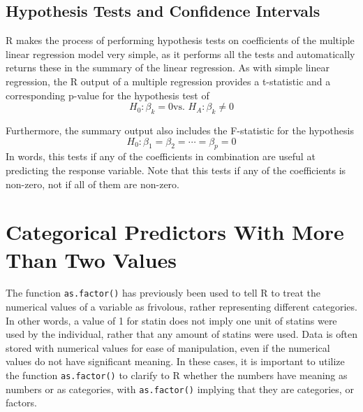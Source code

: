 \documentclass{report}\usepackage[]{graphicx}\usepackage[]{color}
\begin{document}
\subsection{Hypothesis Tests and Confidence Intervals}
\textsf{R} makes the process of performing hypothesis tests on coefficients of the multiple linear regression model very simple, as it performs all the tests and automatically returns these in the summary of the linear regression.  As with simple linear regression, the \textsf{R} output of a multiple regression provides a t-statistic and a corresponding p-value for the hypothesis test of 
\[ H_0: \beta_k = 0 \text{vs. } H_A: \beta_k \neq 0 \]

Furthermore, the summary output also includes the F-statistic for the hypothesis 
\[ H_0: \beta_1 = \beta_2 = \cdots = \beta_p = 0 \]
In words, this tests if any of the coefficients in combination are useful at predicting the response variable.  Note that this tests if any of the coefficients is non-zero, not if all of them are non-zero.  

\section{Categorical Predictors With More Than Two Values}
The function \texttt{as.factor()} has previously been used to tell \textsf{R} to treat the numerical values of a variable as frivolous, rather representing different categories.  In other words, a value of 1 for statin does not imply one unit of statins were used by the individual, rather that any amount of statins were used.  Data is often stored with numerical values for ease of manipulation, even if the numerical values do not have significant meaning.  In these cases, it is important to utilize the function \texttt{as.factor()} to clarify to \textsf{R} whether the numbers have meaning as numbers or as categories, with \texttt{as.factor()} implying that they are categories, or factors.  
\end{document}
